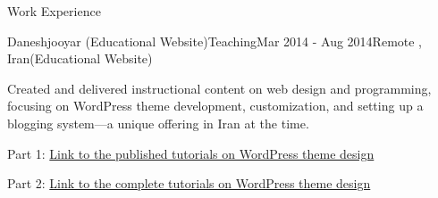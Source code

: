 \documentclass[]{kyvernitis-resume}
\begin{document}
\begin{section}{Work Experience}
 \begin{subsection}{Daneshjooyar (Educational Website)}{Teaching}{Mar 2014 - Aug 2014}{Remote , Iran}{(Educational Website)}
	\item Created and delivered instructional content on web design and programming, focusing on WordPress theme development, customization, and setting up a blogging system—a unique offering in Iran at the time.
	\item Part 1:  \href{https://www.daneshjooyar.com/%d9%82%d8%b3%d9%85%d8%aa-%d9%86%d9%87%d8%a7%db%8c%db%8c-%d8%b3%d8%b1%db%8c-%d8%a2%d9%85%d9%88%d8%b2%d8%b4%db%8c-%d8%b7%d8%b1%d8%a7%d8%ad%db%8c-%d9%82%d8%a7%d9%84%d8%a8-%d9%88%d8%b1%d8%af%d9%be%d8%b1/}{Link to the published tutorials on WordPress theme design} 
	\item Part 2: \href{https://www.daneshjooyar.com/%d8%a2%d9%85%d9%88%d8%b2%d8%b4-%d8%b7%d8%b1%d8%a7%d8%ad%db%8c-%d9%82%d8%a7%d9%84%d8%a8-%d9%88%d8%b1%d8%af%d9%be%d8%b1%d8%b3-%d8%aa%d9%85%d8%a7%d9%85%db%8c-%d9%82%d8%b3%d9%85%d8%aa-%d9%87%d8%a7-%d9%82/}{Link to the complete tutorials on WordPress theme design}
    \end{subsection}
    
\end{section}
\end{document}
